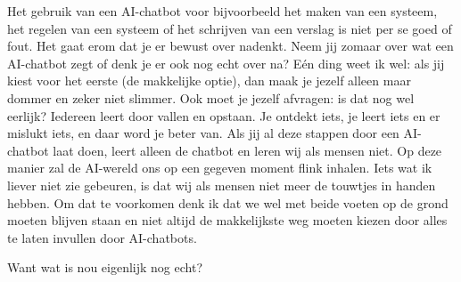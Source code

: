 Het gebruik van een AI-chatbot voor bijvoorbeeld het maken van een systeem, het regelen van een systeem of het schrijven van een verslag is niet per se goed of fout. Het gaat erom dat je er bewust over nadenkt. Neem jij zomaar over wat een AI-chatbot zegt of denk je er ook nog echt over na? Eén ding weet ik wel: als jij kiest voor het eerste (de makkelijke optie), dan maak je jezelf alleen maar dommer en zeker niet slimmer. Ook moet je jezelf afvragen: is dat nog wel eerlijk? Iedereen leert door vallen en opstaan. Je ontdekt iets, je leert iets en er mislukt iets, en daar word je beter van. Als jij al deze stappen door een AI-chatbot laat doen, leert alleen de chatbot en leren wij als mensen niet. Op deze manier zal de AI-wereld ons op een gegeven moment flink inhalen. Iets wat ik liever niet zie gebeuren, is dat wij als mensen niet meer de touwtjes in handen hebben. Om dat te voorkomen denk ik dat we wel met beide voeten op de grond moeten blijven staan en niet altijd de makkelijkste weg moeten kiezen door alles te laten invullen door AI-chatbots.

\vspace{.25cm}

Want wat is nou eigenlijk nog echt?

\cite{cm}
\cite{De_Volkskrant}
\cite{Filosofie}
